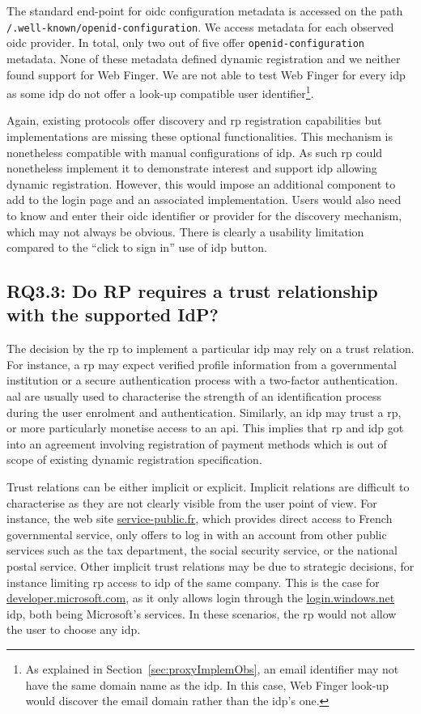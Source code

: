 The standard end-point for \gls{oidc} configuration metadata is accessed on the path \texttt{/.well-known/openid-configuration}.
We access metadata for each observed \gls{oidc} provider.
In total, only two out of five offer \texttt{openid-configuration} metadata.
None of these metadata defined dynamic registration and we neither found support for Web Finger.
We are not able to test Web Finger for every \gls{idp} as some \gls{idp} do not offer a look-up compatible user identifier\footnote{As explained in Section~\ref{sec:proxyImplemObs}, an email identifier may not have the same domain name as the \gls{idp}. In this case, Web Finger look-up would discover the email domain rather than the \gls{idp}'s one.}.

Again, existing protocols offer discovery and \gls{rp} registration capabilities but implementations are missing these optional functionalities.
This mechanism is nonetheless compatible with manual configurations of \gls{idp}.
As such \gls{rp} could nonetheless implement it to demonstrate interest and support \gls{idp} allowing dynamic registration.
However, this would impose an additional component to add to the login page and an associated implementation. 
Users would also need to know and enter their \gls{oidc} identifier or provider for the discovery mechanism, which may not always be obvious.
There is clearly a usability limitation compared to the ``click to sign in'' use of \gls{idp} button.

\subsection{RQ3.3: Do RP requires a trust relationship with the supported IdP?}
\label{toto}
\label{userschooseidp:h3}
The decision by the \gls{rp} to implement a particular \gls{idp} may rely on a trust relation.
For instance, a \gls{rp} may expect verified profile information from a governmental institution or a secure authentication process with a two-factor authentication.
\Gls{aal} are usually used to characterise the strength of an identification process during the user enrolment and authentication.
Similarly, an \gls{idp} may trust a \gls{rp}, or more particularly monetise access to an \gls{api}.
This implies that \gls{rp} and \gls{idp} got into an agreement involving registration of payment methods which is out of scope of existing dynamic registration specification.

Trust relations can be either implicit or explicit.
Implicit relations are difficult to characterise as they are not clearly visible from the user point of view.
For instance, the web site \url{service-public.fr}, which provides direct access to French governmental service, only offers to log in with an account from other public services such as the tax department, the social security service, or the national postal service. Other implicit trust relations may be due to strategic decisions, for instance limiting \gls{rp} access to \gls{idp} of the same company. 
This is the case for \url{developer.microsoft.com}, as it only allows login through the \url{login.windows.net} \gls{idp}, both being Microsoft's services.
In these scenarios, the \gls{rp} would not allow the user to choose any \gls{idp}. 

